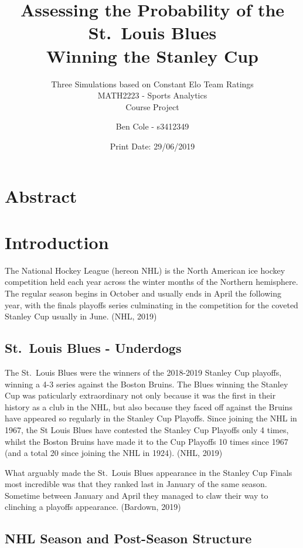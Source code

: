 \documentclass[]{article}
\title{Assessing the Probability of the St.~Louis Blues\\
Winning the Stanley Cup}
\subtitle{Three Simulations based on Constant Elo Team
Ratings\\[2\baselineskip]MATH2223 - Sports Analytics\\
Course Project}
\author{Ben Cole - s3412349}
\date{Print Date: 29/06/2019}
\begin{document}
\maketitle

{
\setcounter{tocdepth}{3}
\tableofcontents
}
\section{Abstract}\label{abstract}

\section{Introduction}\label{introduction}

The National Hockey League (hereon NHL) is the North American ice hockey
competition held each year across the winter months of the Northern
hemisphere. The regular season begins in October and usually ends in
April the following year, with the finals playoffs series culminating in
the competition for the coveted Stanley Cup usually in June. (NHL, 2019)

\subsection{St.~Louis Blues -
Underdogs}\label{st.louis-blues---underdogs}

The St.~Louis Blues were the winners of the 2018-2019 Stanley Cup
playoffs, winning a 4-3 series against the Boston Bruins. The Blues
winning the Stanley Cup was paticularly extraordinary not only because
it was the first in their history as a club in the NHL, but also because
they faced off against the Bruins have appeared so regularly in the
Stanley Cup Playoffs. Since joining the NHL in 1967, the St Louis Blues
have contested the Stanley Cup Playoffs only 4 times, whilst the Boston
Bruins have made it to the Cup Playoffs 10 times since 1967 (and a total
20 since joining the NHL in 1924). (NHL, 2019)

What arguably made the St.~Louis Blues appearance in the Stanley Cup
Finals most incredible was that they ranked last in January of the same
season. Sometime between January and April they managed to claw their
way to clinching a playoffs appearance. (Bardown, 2019)

\subsection{NHL Season and Post-Season
Structure}\label{nhl-season-and-post-season-structure}
\end{document}
